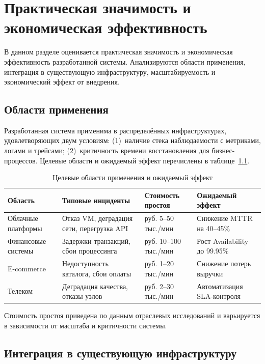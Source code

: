 \chapter{Практическая значимость и экономическая эффективность}\label{ch:economic}

В данном разделе оценивается практическая значимость и экономическая эффективность разработанной системы. Анализируются области применения, интеграция в существующую инфраструктуру, масштабируемость и экономический эффект от внедрения.

\section{Области применения}

Разработанная система применима в распределённых инфраструктурах, удовлетворяющих двум условиям: (1)~наличие стека наблюдаемости с метриками, логами и трейсами; (2)~критичность времени восстановления для бизнес-процессов. Целевые области и ожидаемый эффект перечислены в таблице~\ref{tab:application_areas}.

\begin{table}[H]
\centering
\small
\caption{Целевые области применения и ожидаемый эффект}
\label{tab:application_areas}
\begin{tabular}{|p{2.8cm}|p{3.5cm}|p{2.5cm}|p{3.5cm}|}
\hline
\textbf{Область} & \textbf{Типовые инциденты} & \textbf{Стоимость простоя} & \textbf{Ожидаемый эффект} \\
\hline
Облачные платформы & Отказ VM, деградация сети, перегрузка API & руб. 5--50 тыс./мин & Снижение MTTR на 40--45\% \\
\hline
Финансовые системы & Задержки транзакций, сбои процессинга & руб. 10--100 тыс./мин & Рост Availability до 99.95\% \\
\hline
E-commerce & Недоступность каталога, сбои оплаты & руб. 1--20 тыс./мин & Снижение потерь выручки \\
\hline
Телеком & Деградация качества, отказы узлов & руб. 2--30 тыс./мин & Автоматизация SLA-контроля \\
\hline
\end{tabular}
\end{table}

Стоимость простоя приведена по данным отраслевых исследований \cite{amazon_outage_cost} и варьируется в зависимости от масштаба и критичности системы.

\section{Интеграция в существующую инфраструктуру}

